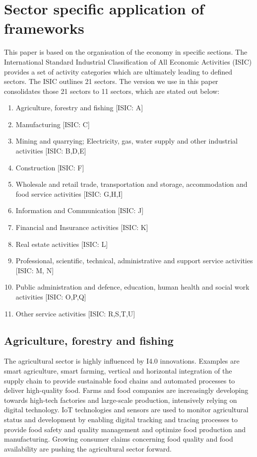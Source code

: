 \section{Sector specific application of frameworks}

This paper is based on the organisation of the economy in specific sections. The International Standard Industrial Classification of All Economic Activities (\ac{ISIC}) provides a set of activity categories which are ultimately leading to defined sectors. The \ac{ISIC} outlines 21 sectors. The version we use in this paper consolidates those 21 sectors to 11 sectors, which are stated out below: \cite[p.271, table 4]{ISIC:2008}

\begin{enumerate}
\item Agriculture, forestry and fishing [ISIC: A]
\item Manufacturing [ISIC: C]
\item Mining and quarrying; Electricity, gas, water supply and other industrial activities [ISIC: B,D,E]
\item Construction [ISIC: F]
\item Wholesale and retail trade, transportation and storage, accommodation and food service activities [ISIC: G,H,I]
\item Information and Communication [ISIC: J]
\item Financial and Insurance activities [ISIC: K]
\item Real estate activities [ISIC: L]
\item Professional, scientific, technical, administrative and support service activities [ISIC: M, N]
\item Public administration and defence, education, human health and social work activities [ISIC: O,P,Q]
\item Other service activities [ISIC: R,S,T,U]
\end{enumerate}

\subsection{Agriculture, forestry and fishing}

The agricultural sector is highly influenced by \ac{I4.0} innovations. Examples are smart agriculture, smart farming, vertical and horizontal integration of the supply chain to provide sustainable food chains and automated processes to deliver high-quality food. Farms and food companies are increasingly developing towards high-tech factories and large-scale production, intensively relying on digital technology. \cite[p.129-151]{FoodAndFarm2020} \ac{IoT} technologies and sensors are used to monitor agricultural status and development by enabling digital tracking and tracing processes to provide food safety and quality management and optimize food production and manufacturing. Growing consumer claims concerning food quality and food availability are pushing the agricultural sector forward.

